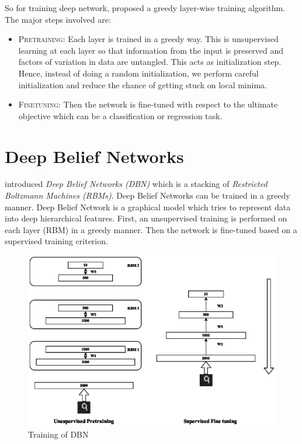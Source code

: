 So for training deep network, \citet{hinton2006reducing} proposed a greedy layer-wise training algorithm. The major steps involved are:
\begin{itemize}
\item \textsc{Pretraining}: Each layer is trained in a greedy way. This is unsupervised learning at each layer so that information from the input is preserved and factors of variation in data are untangled. This acts as initialization step. Hence, instead of doing a random initialization, we perform careful initialization and reduce the chance of getting stuck on local minima.
\item \textsc{Finetuning}: Then the network is fine-tuned with respect to the ultimate objective which can be a classification or regression task.
\end{itemize}

\section{Deep Belief Networks}
\citet{hinton2006reducing} introduced \emph{Deep Belief Networks (DBN)} which is a stacking of \emph{Restricted Boltzmann Machines (RBMs)}. Deep Belief Networks can be trained in a greedy manner\cite{hinton2006reducing}. Deep Belief Network is a graphical model which tries to represent data into deep hierarchical features. First, an unsupervised training is performed on each layer (RBM) in a greedy manner. Then the network is fine-tuned based on a supervised training criterion.\\
\begin{figure}[!ht]
\centering
\includegraphics[width=1\textwidth]{./imgs/RBM_Train.eps} 
\caption{Training of DBN}
\end{figure}

